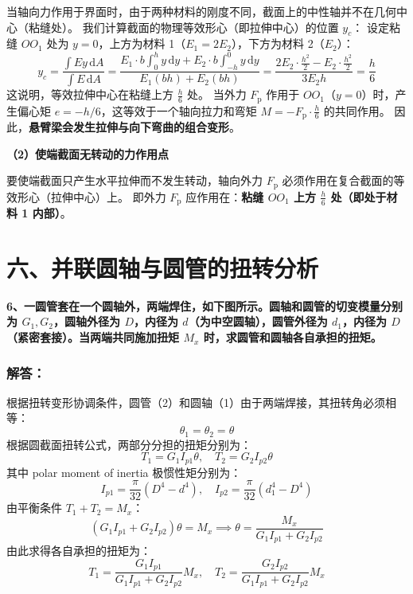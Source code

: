 \documentclass[UTF8,fontset=windows]{ctexart}
\newcommand{\diff}{\,\mathrm{d}}
\begin{document}
当轴向力作用于界面时，由于两种材料的刚度不同，截面上的中性轴并不在几何中心（粘缝处）。
我们计算截面的物理等效形心（即拉伸中心）的位置 $y_c$：
设定粘缝 $OO_1$ 处为 $y=0$，上方为材料 1（$E_1=2E_2$），下方为材料 2（$E_2$）：
\[
    y_c = \frac{\int E y \diff A}{\int E \diff A} = \frac{E_1 \cdot b \int_{0}^h y \diff y + E_2 \cdot b \int_{-h}^0 y \diff y}{E_1 (bh) + E_2 (bh)} = \frac{2 E_2 \cdot \frac{h^2}{2} - E_2 \cdot \frac{h^2}{2}}{3 E_2 h} = \frac{h}{6}
\]
这说明，等效拉伸中心在粘缝上方 $\frac{h}{6}$ 处。
当外力 $F_{\text{p}}$ 作用于 $OO_1$（$y=0$）时，产生偏心矩 $e = -h/6$，这等效于一个轴向拉力和弯矩 $M = -F_{\text{p}} \cdot \frac{h}{6}$ 的共同作用。
因此，\textbf{悬臂梁会发生拉伸与向下弯曲的组合变形}。

\textbf{（2）使端截面无转动的力作用点}

要使端截面只产生水平拉伸而不发生转动，轴向外力 $F_{\text{p}}$ 必须作用在复合截面的等效形心（拉伸中心）上。
即外力 $F_{\text{p}}$ 应作用在：\textbf{粘缝 $OO_1$ 上方 $\frac{h}{6}$ 处（即处于材料 1 内部）}。

\newpage

\section*{六、并联圆轴与圆管的扭转分析}

\textbf{6、一圆管套在一个圆轴外，两端焊住，如下图所示。圆轴和圆管的切变模量分别为 $G_1, G_2$，圆轴外径为 $D$，内径为 $d$（为中空圆轴），圆管外径为 $d_1$，内径为 $D$（紧密套接）。当两端共同施加扭矩 $M_x$ 时，求圆管和圆轴各自承担的扭矩。}

\subsubsection*{解答：}

根据扭转变形协调条件，圆管（2）和圆轴（1）由于两端焊接，其扭转角必须相等：
\[
    \theta_1 = \theta_2 = \theta
\]
根据圆截面扭转公式，两部分分担的扭矩分别为：
\[
    T_1 = G_1 I_{p1} \theta, \quad T_2 = G_2 I_{p2} \theta
\]
其中 polar moment of inertia 极惯性矩分别为：
\[
    I_{p1} = \frac{\pi}{32}(D^4 - d^4), \quad I_{p2} = \frac{\pi}{32}(d_1^4 - D^4)
\]
由平衡条件 $T_1 + T_2 = M_x$：
\[
    (G_1 I_{p1} + G_2 I_{p2}) \theta = M_x \implies \theta = \frac{M_x}{G_1 I_{p1} + G_2 I_{p2}}
\]
由此求得各自承担的扭矩为：
\[
    T_1 = \frac{G_1 I_{p1}}{G_1 I_{p1} + G_2 I_{p2}} M_x, \quad T_2 = \frac{G_2 I_{p2}}{G_1 I_{p1} + G_2 I_{p2}} M_x
\]
\end{document}
